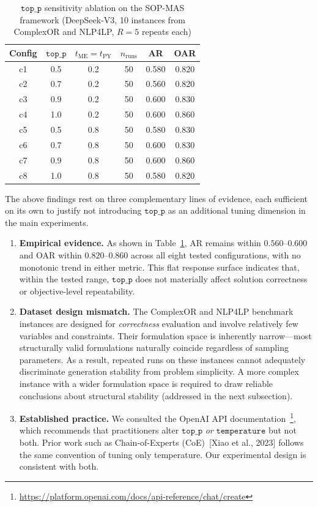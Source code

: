 \documentclass[11pt,a4paper]{article}
\begin{document}
\begin{table}[htbp]
  \centering
  \caption{$\texttt{top\_p}$ sensitivity ablation on the SOP-MAS framework (DeepSeek-V3, 10 instances from ComplexOR and NLP4LP, $R{=}5$ repeats each)}
  \label{tab:topp_ablation}
  \begin{tabular}{cccccc}
    \toprule
    Config & $\texttt{top\_p}$ & $t_\text{ME}{=}t_\text{PY}$ & $n_{\mathrm{runs}}$ & AR & OAR \\
    \midrule
    c1 & 0.5 & 0.2 & 50 & 0.580 & 0.820 \\
    c2 & 0.7 & 0.2 & 50 & 0.560 & 0.820 \\
    c3 & 0.9 & 0.2 & 50 & 0.600 & 0.830 \\
    c4 & 1.0 & 0.2 & 50 & 0.600 & 0.860 \\
    c5 & 0.5 & 0.8 & 50 & 0.580 & 0.830 \\
    c6 & 0.7 & 0.8 & 50 & 0.600 & 0.830 \\
    c7 & 0.9 & 0.8 & 50 & 0.600 & 0.860 \\
    c8 & 1.0 & 0.8 & 50 & 0.580 & 0.820 \\
    \bottomrule
  \end{tabular}
\end{table}

The above findings rest on three complementary lines of evidence, each sufficient on its own to justify not introducing $\texttt{top\_p}$ as an additional tuning dimension in the main experiments.

\begin{enumerate}
    \item \textbf{Empirical evidence.} As shown in Table~\ref{tab:topp_ablation}, AR remains within $0.560$--$0.600$ and OAR within $0.820$--$0.860$ across all eight tested configurations, with no monotonic trend in either metric. This flat response surface indicates that, within the tested range, $\texttt{top\_p}$ does not materially affect solution correctness or objective-level repeatability.

    \item \textbf{Dataset design mismatch.} The ComplexOR and NLP4LP benchmark instances are designed for \emph{correctness} evaluation and involve relatively few variables and constraints. Their formulation space is inherently narrow---most structurally valid formulations naturally coincide regardless of sampling parameters. As a result, repeated runs on these instances cannot adequately discriminate generation stability from problem simplicity. A more complex instance with a wider formulation space is required to draw reliable conclusions about structural stability (addressed in the next subsection).

    \item \textbf{Established practice.} We consulted the OpenAI API documentation~\footnote{\url{https://platform.openai.com/docs/api-reference/chat/create}}, which recommends that practitioners alter $\texttt{top\_p}$ \emph{or} $\texttt{temperature}$ but not both. Prior work such as Chain-of-Experts (CoE)~[Xiao et al., 2023] follows the same convention of tuning only temperature. Our experimental design is consistent with both.
\end{enumerate}
\end{document}
